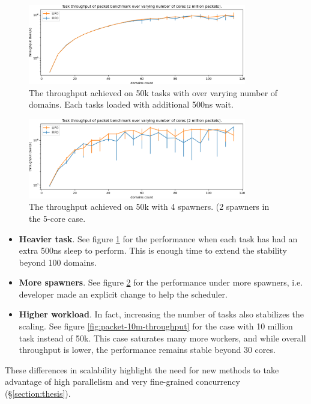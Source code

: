 \documentclass[12pt,a4paper,twoside]{report}
\begin{document}
\begin{figure} 
     \centering
     \includegraphics[width=0.85\textwidth]{eval/packet-basic-slowed_2.png}
     \caption{The throughput achieved on 50k tasks with over varying number of domains. Each tasks loaded with additional 500ns wait.}
    \label{fig:packet-slowed}
\end{figure}


\begin{figure} 
     \centering 
     \includegraphics[width=0.85\textwidth]{eval/packet-basic-4spawners-just-throughput.png}
     \caption{The throughput achieved on 50k with 4 spawners. (2 spawners in the 5-core case. }
    \label{fig:packet-4spawners}
\end{figure}
\begin{itemize}
    \item \textbf{Heavier task}. See figure \ref{fig:packet-slowed} for the performance when each task has had an extra 500ns sleep to perform. This is enough time to extend the stability beyond 100 domains.
    \item \textbf{More spawners}. See figure \ref{fig:packet-4spawners} for the performance under more spawners, i.e. developer made an explicit change to help the scheduler.
    \item \textbf{Higher workload}. In fact, increasing the number of tasks also stabilizes the scaling. See figure \ref{fig:packet-10m-throughput} for the case with 10 million task instead of 50k. This case saturates many more workers, and while overall throughput is lower, the performance remains stable beyond 30 cores. 
\end{itemize}
These differences in scalability highlight the need for new methods to take advantage of high parallelism and very fine-grained concurrency (\S\ref{section:thesis}).
\end{document}
